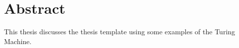\chapter{Abstract}
This thesis discusses the thesis template using some examples of the Turing Machine.